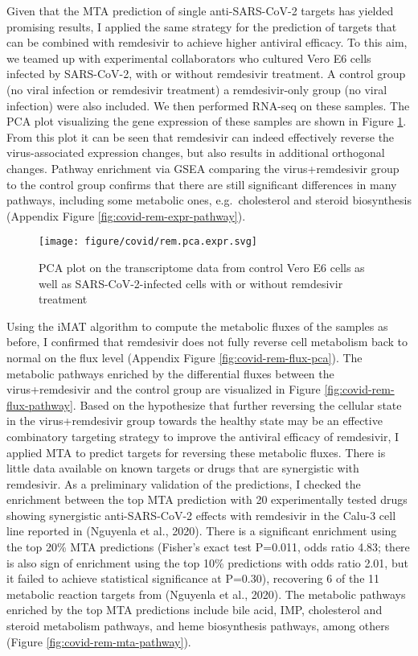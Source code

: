 \documentclass[12pt,twoside,openany,\mydriver]{thesis}  %
\begin{document}
Given that the MTA prediction of single anti-SARS-CoV-2 targets has yielded promising results, I applied the same strategy for the prediction of targets that can be combined with remdesivir to achieve higher antiviral efficacy. To this aim, we teamed up with experimental collaborators who cultured Vero E6 cells infected by SARS-CoV-2, with or without remdesivir treatment. A control group (no viral infection or remdesivir treatment) a remdesivir-only group (no viral infection) were also included. We then performed RNA-seq on these samples. The PCA plot visualizing the gene expression of these samples are shown in Figure \ref{fig:covid-rem-expr-pca}. From this plot it can be seen that remdesivir can indeed effectively reverse the virus-associated expression changes, but also results in additional orthogonal changes. Pathway enrichment via GSEA comparing the virus+remdesivir group to the control group confirms that there are still significant differences in many pathways, including some metabolic ones, e.g.~cholesterol and steroid biosynthesis (Appendix Figure \ref{fig:covid-rem-expr-pathway}).
\begin{figure}
\texttt{[image: figure/covid/rem.pca.expr.svg]} \caption{PCA plot on the transcriptome data from control Vero E6 cells as well as SARS-CoV-2-infected cells with or without remdesivir treatment}\label{fig:covid-rem-expr-pca}
\end{figure}
Using the iMAT algorithm to compute the metabolic fluxes of the samples as before, I confirmed that remdesivir does not fully reverse cell metabolism back to normal on the flux level (Appendix Figure \ref{fig:covid-rem-flux-pca}). The metabolic pathways enriched by the differential fluxes between the virus+remdesivir and the control group are visualized in Figure \ref{fig:covid-rem-flux-pathway}. Based on the hypothesize that further reversing the cellular state in the virus+remdesivir group towards the healthy state may be an effective combinatory targeting strategy to improve the antiviral efficacy of remdesivir, I applied MTA to predict targets for reversing these metabolic fluxes. There is little data available on known targets or drugs that are synergistic with remdesivir. As a preliminary validation of the predictions, I checked the enrichment between the top MTA prediction with 20 experimentally tested drugs showing synergistic anti-SARS-CoV-2 effects with remdesivir in the Calu-3 cell line reported in (Nguyenla et al., 2020). There is a significant enrichment using the top 20\% MTA predictions (Fisher's exact test P=0.011, odds ratio 4.83; there is also sign of enrichment using the top 10\% predictions with odds ratio 2.01, but it failed to achieve statistical significance at P=0.30), recovering 6 of the 11 metabolic reaction targets from (Nguyenla et al., 2020). The metabolic pathways enriched by the top MTA predictions include bile acid, IMP, cholesterol and steroid metabolism pathways, and heme biosynthesis pathways, among others (Figure \ref{fig:covid-rem-mta-pathway}).
\end{document}
